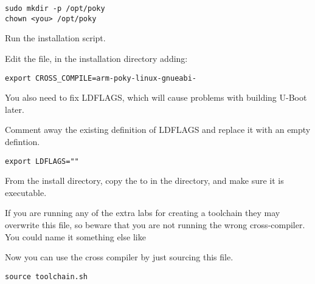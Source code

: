 \begin{verbatim}
sudo mkdir -p /opt/poky
chown <you> /opt/poky
\end{verbatim}

Run the installation script.

Edit the  file, 
in the installation directory adding:

\begin{verbatim}
export CROSS_COMPILE=arm-poky-linux-gnueabi-
\end{verbatim}

You also need to fix LDFLAGS, which will cause problems with building U-Boot later.

Comment away the existing definition of LDFLAGS and replace it with an empty defintion.

\begin{verbatim}
export LDFLAGS=""
\end{verbatim}

From the install directory, copy the 
 to
 in the \labdir directory, and make sure it is executable.

If you are running any of the extra labs for creating a toolchain
they may overwrite this file, so beware that you are not running
the wrong cross-compiler. You could name it something else like

Now you can use the cross compiler by just sourcing this file.

\begin{verbatim}
source toolchain.sh
\end{verbatim}

